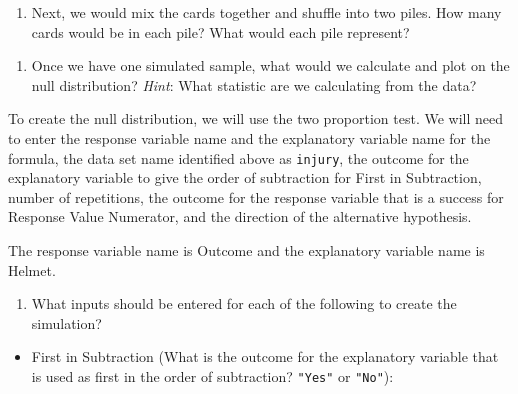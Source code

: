 \documentclass[
]{report}
\providecommand{\tightlist}{%
  \setlength{\itemsep}{0pt}\setlength{\parskip}{0pt}}
\begin{document}
\vspace{0.5in}

\begin{enumerate}
\def\labelenumi{\arabic{enumi}.}
\setcounter{enumi}{1}
\tightlist
\item
  Next, we would mix the cards together and shuffle into two piles. How many cards would be in each pile? What would each pile represent?
\end{enumerate}

\vspace{1in}

\begin{enumerate}
\def\labelenumi{\arabic{enumi}.}
\setcounter{enumi}{2}
\tightlist
\item
  Once we have one simulated sample, what would we calculate and plot on the null distribution? \emph{Hint}: What statistic are we calculating from the data?
\end{enumerate}

\vspace{1in}

To create the null distribution, we will use the two proportion test. We will need to enter the response variable name and the explanatory variable name for the formula, the data set name identified above as \texttt{injury}, the outcome for the explanatory variable to give the order of subtraction for First in Subtraction, number of repetitions, the outcome for the response variable that is a success for Response Value Numerator, and the direction of the alternative hypothesis.

The response variable name is Outcome and the explanatory variable name is Helmet.

\newpage

\begin{enumerate}
\def\labelenumi{\arabic{enumi}.}
\setcounter{enumi}{3}
\tightlist
\item
  What inputs should be entered for each of the following to create the simulation?
\end{enumerate}

\vspace{.2in}

\begin{itemize}
\tightlist
\item
  First in Subtraction (What is the outcome for the explanatory variable that is used as first in the order of subtraction? \texttt{"Yes"} or \texttt{"No"}):
\end{itemize}
\end{document}
